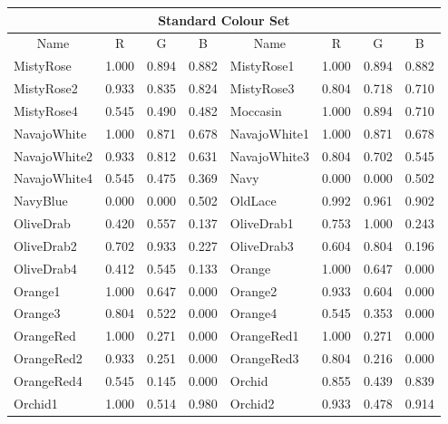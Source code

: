 {\begin{center}
\begin{tabular}{|l|l|l|l|l|l|l|l|}
\hline
\multicolumn{8}{|c|}{{\large Standard Colour Set}} \\ \hline
\multicolumn{1}{|c|}{Name} & \multicolumn{1}{|c|}{R} & \multicolumn{1}{c|}{G} &
\multicolumn{1}{c|}{B} & \multicolumn{1}{|c|}{Name} & \multicolumn{1}{c|}{R} &
\multicolumn{1}{c|}{G} & \multicolumn{1}{c|}{B}  \\ \hline
MistyRose           & 1.000 & 0.894 & 0.882 & MistyRose1          & 1.000 & 0.894 & 0.882 \\ 
MistyRose2          & 0.933 & 0.835 & 0.824 & MistyRose3          & 0.804 & 0.718 & 0.710 \\ 
MistyRose4          & 0.545 & 0.490 & 0.482 & Moccasin            & 1.000 & 0.894 & 0.710 \\ 
NavajoWhite         & 1.000 & 0.871 & 0.678 & NavajoWhite1        & 1.000 & 0.871 & 0.678 \\ 
NavajoWhite2        & 0.933 & 0.812 & 0.631 & NavajoWhite3        & 0.804 & 0.702 & 0.545 \\ 
NavajoWhite4        & 0.545 & 0.475 & 0.369 & Navy                & 0.000 & 0.000 & 0.502 \\ 
NavyBlue            & 0.000 & 0.000 & 0.502 & OldLace             & 0.992 & 0.961 & 0.902 \\ 
OliveDrab           & 0.420 & 0.557 & 0.137 & OliveDrab1          & 0.753 & 1.000 & 0.243 \\ 
OliveDrab2          & 0.702 & 0.933 & 0.227 & OliveDrab3          & 0.604 & 0.804 & 0.196 \\ 
OliveDrab4          & 0.412 & 0.545 & 0.133 & Orange              & 1.000 & 0.647 & 0.000 \\ 
Orange1             & 1.000 & 0.647 & 0.000 & Orange2             & 0.933 & 0.604 & 0.000 \\ 
Orange3             & 0.804 & 0.522 & 0.000 & Orange4             & 0.545 & 0.353 & 0.000 \\ 
OrangeRed           & 1.000 & 0.271 & 0.000 & OrangeRed1          & 1.000 & 0.271 & 0.000 \\ 
OrangeRed2          & 0.933 & 0.251 & 0.000 & OrangeRed3          & 0.804 & 0.216 & 0.000 \\ 
OrangeRed4          & 0.545 & 0.145 & 0.000 & Orchid              & 0.855 & 0.439 & 0.839 \\ 
Orchid1             & 1.000 & 0.514 & 0.980 & Orchid2             & 0.933 & 0.478 & 0.914 \\ 

\end{tabular}
\end{center}}

